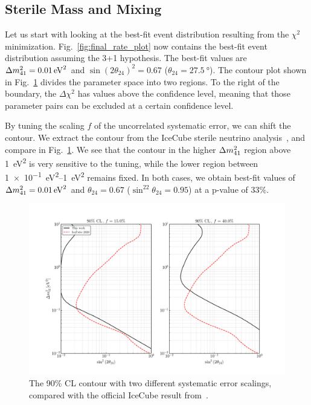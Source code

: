 \subsection{Sterile Mass and Mixing}
Let us start with looking at the best-fit event distribution resulting from the $\chi^2$ minimization.
Fig.~\ref{fig:final_rate_plot} now contains the best-fit event distribution assuming the 3+1 hypothesis.
The best-fit values are $\dm[41] = \SI{0.01}{\eV\squared}$ and 
$\sin(2\theta_{24})^2 = 0.67$ ($\theta_{24} = \SI{27.5}{\degree}$). 
The contour plot shown in Fig.~\ref{fig:error_tuning} divides the parameter space into two regions.
To the right of the boundary, the $\Delta \chi^2$ has values above the confidence level, meaning that 
those parameter pairs can be excluded at a certain confidence level.

By tuning the scaling $f$ of the uncorrelated systematic error, we can shift the contour. We extract the contour from the 
IceCube sterile neutrino analysis~\cite{IC2020}, and compare in Fig.~\ref{fig:error_tuning}. We see that the contour in the 
higher $\dm[41]$ region above \SI{1}{\eV\squared} is very sensitive to the tuning, while the lower region between \SIrange[]{1e-1}{1}{\eV\squared}
remains fixed. In both cases, we obtain best-fit values of $\dm[41] = \SI{0.01}{\eV^2}$ and $\theta_{24} = 0.67$ ($\sin^22\theta_{24} = 0.95$) at 
a p-value of $33\%$.
\begin{figure}
    \centering
    \includegraphics[scale=0.58]{figures/s24_error_tuning.pdf}
    \caption{The 90\% CL contour with two different systematic error scalings, compared 
    with the official IceCube result from~\cite{IC2020}.}\label{fig:error_tuning}
\end{figure}

